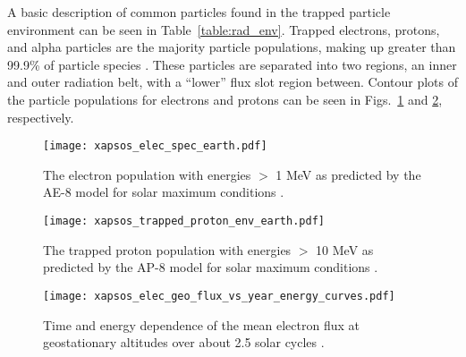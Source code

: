 A basic description of common particles found in the trapped particle environment can be seen in Table~\ref{table:rad_env}.
Trapped electrons, protons, and alpha particles are the majority particle populations, making up greater than 99.9\% of particle species \cite{xapsos:2006}. 
These particles are separated into two regions, an inner and outer radiation belt, with a ``lower'' flux slot region between.
Contour plots of the particle populations for electrons and protons can be seen in Figs.~\ref{fig:earth-trapped-electrons} and \ref{fig:earth-trapped-protons}, respectively.
\begin{figure}[htbp]
    \begin{center}
        \texttt{[image: xapsos\_elec\_spec\_earth.pdf]}
    \end{center}
    \caption[The electron population with energies $>$ 1 MeV as predicted by the AE-8 model for solar maximum conditions.]{The electron population with energies $>$ 1 MeV as predicted by the AE-8 model for solar maximum conditions \cite{xapsos:2006}.}
    \label{fig:earth-trapped-electrons}
\end{figure}
\begin{figure}[htbp]
    \begin{center}
        \texttt{[image: xapsos\_trapped\_proton\_env\_earth.pdf]}
    \end{center}
    \caption[The trapped proton population with energies $>$ 10 MeV as predicted by the AP-8 model for solar maximum conditions.]{The trapped proton population with energies $>$ 10 MeV as predicted by the AP-8 model for solar maximum conditions \cite{xapsos:2006}.}
    \label{fig:earth-trapped-protons}
\end{figure}
\begin{figure}[tb]
    \begin{center}
        \texttt{[image: xapsos\_elec\_geo\_flux\_vs\_year\_energy\_curves.pdf]}
    \end{center}
    \caption[Time and energy dependence of the mean electron flux at geostationary altitudes over about 2.5 solar cycles.]{Time and energy dependence of the mean electron flux at geostationary altitudes over about 2.5 solar cycles \cite{piet2006model}.}
    \label{fig:elec-geo-flux-vs-year}
\end{figure}


